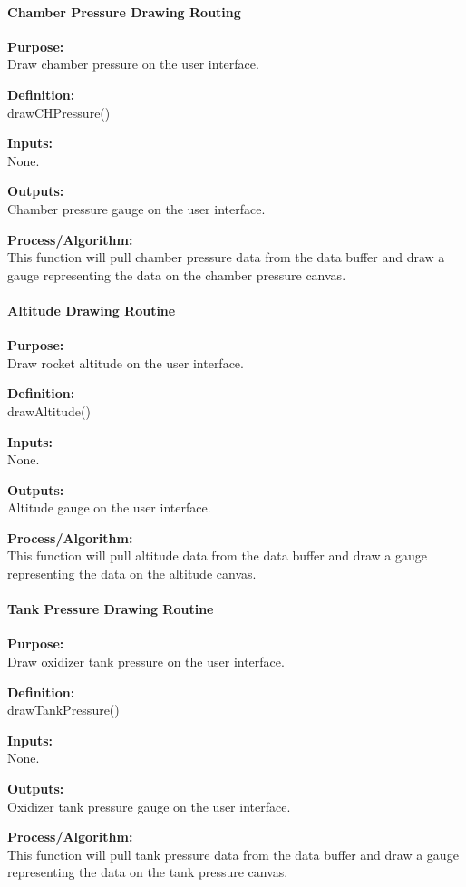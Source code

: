 \documentclass[10pt,draftclsnofoot,onecolumn,retainorgcmds]{IEEEtran}
\begin{document}
\paragraph{Chamber Pressure Drawing Routing}
{\bf Purpose:} \\
Draw chamber pressure on the user interface. \par
{\bf Definition:} \\ 
drawCHPressure() \par
{\bf Inputs:} \\None. \par
{\bf Outputs:} \\Chamber pressure gauge on the user interface.\par
{\bf Process/Algorithm:} \\
This function will pull chamber pressure data from the data buffer and draw a gauge representing the data on the chamber pressure canvas. \par

\paragraph{Altitude Drawing Routine}
{\bf Purpose:} \\
Draw rocket altitude on the user interface. \par
{\bf Definition:} \\ 
drawAltitude() \par
{\bf Inputs:} \\None. \par
{\bf Outputs:} \\Altitude gauge on the user interface.\par
{\bf Process/Algorithm:} \\
This function will pull altitude data from the data buffer and draw a gauge representing the data on the altitude canvas. \par

\paragraph{Tank Pressure Drawing Routine}
{\bf Purpose:} \\
Draw oxidizer tank pressure on the user interface. \par
{\bf Definition:} \\ 
drawTankPressure() \par
{\bf Inputs:} \\None. \par
{\bf Outputs:} \\Oxidizer tank pressure gauge on the user interface.\par
{\bf Process/Algorithm:} \\
This function will pull tank pressure data from the data buffer and draw a gauge representing the data on the tank pressure canvas. \par
\end{document}
